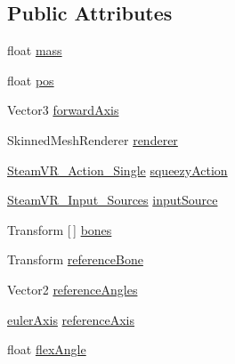 \subsection*{Public Attributes}
\begin{DoxyCompactItemize}
\item 
float \mbox{\hyperlink{class_valve_1_1_v_r_1_1_interaction_system_1_1_sample_1_1_floppy_hand_1_1_finger_a502856d0674454805e8eaaa1fe0be25f}{mass}}
\item 
float \mbox{\hyperlink{class_valve_1_1_v_r_1_1_interaction_system_1_1_sample_1_1_floppy_hand_1_1_finger_abbd1ec5bec644d075e5c1c873f933cf3}{pos}}
\item 
Vector3 \mbox{\hyperlink{class_valve_1_1_v_r_1_1_interaction_system_1_1_sample_1_1_floppy_hand_1_1_finger_aa892ac83a5c52d544b351626966db389}{forward\+Axis}}
\item 
Skinned\+Mesh\+Renderer \mbox{\hyperlink{class_valve_1_1_v_r_1_1_interaction_system_1_1_sample_1_1_floppy_hand_1_1_finger_aa17900f1725a656f59c4860f9cdc9f02}{renderer}}
\item 
\mbox{\hyperlink{class_valve_1_1_v_r_1_1_steam_v_r___action___single}{Steam\+V\+R\+\_\+\+Action\+\_\+\+Single}} \mbox{\hyperlink{class_valve_1_1_v_r_1_1_interaction_system_1_1_sample_1_1_floppy_hand_1_1_finger_a62ee9ab8729a763df7f2c3d904cb66d7}{squeezy\+Action}}
\item 
\mbox{\hyperlink{namespace_valve_1_1_v_r_a82e5bf501cc3aa155444ee3f0662853f}{Steam\+V\+R\+\_\+\+Input\+\_\+\+Sources}} \mbox{\hyperlink{class_valve_1_1_v_r_1_1_interaction_system_1_1_sample_1_1_floppy_hand_1_1_finger_a1aa6147709a85f101f079f5ec79c2401}{input\+Source}}
\item 
Transform \mbox{[}$\,$\mbox{]} \mbox{\hyperlink{class_valve_1_1_v_r_1_1_interaction_system_1_1_sample_1_1_floppy_hand_1_1_finger_a642253f31fc17304621931c87cb1feb7}{bones}}
\item 
Transform \mbox{\hyperlink{class_valve_1_1_v_r_1_1_interaction_system_1_1_sample_1_1_floppy_hand_1_1_finger_a930b396460d6fc8f666ce9e2be42f61e}{reference\+Bone}}
\item 
Vector2 \mbox{\hyperlink{class_valve_1_1_v_r_1_1_interaction_system_1_1_sample_1_1_floppy_hand_1_1_finger_a462044c1d5078065ae06832807d979fc}{reference\+Angles}}
\item 
\mbox{\hyperlink{class_valve_1_1_v_r_1_1_interaction_system_1_1_sample_1_1_floppy_hand_1_1_finger_ab6442b559d46bdb7c1a046dcba1fa76d}{euler\+Axis}} \mbox{\hyperlink{class_valve_1_1_v_r_1_1_interaction_system_1_1_sample_1_1_floppy_hand_1_1_finger_ac9272e21d2e98009390759e68a902e85}{reference\+Axis}}
\item 
float \mbox{\hyperlink{class_valve_1_1_v_r_1_1_interaction_system_1_1_sample_1_1_floppy_hand_1_1_finger_ac58ae50473700384959c4270e519c4a1}{flex\+Angle}}
\end{DoxyCompactItemize}



